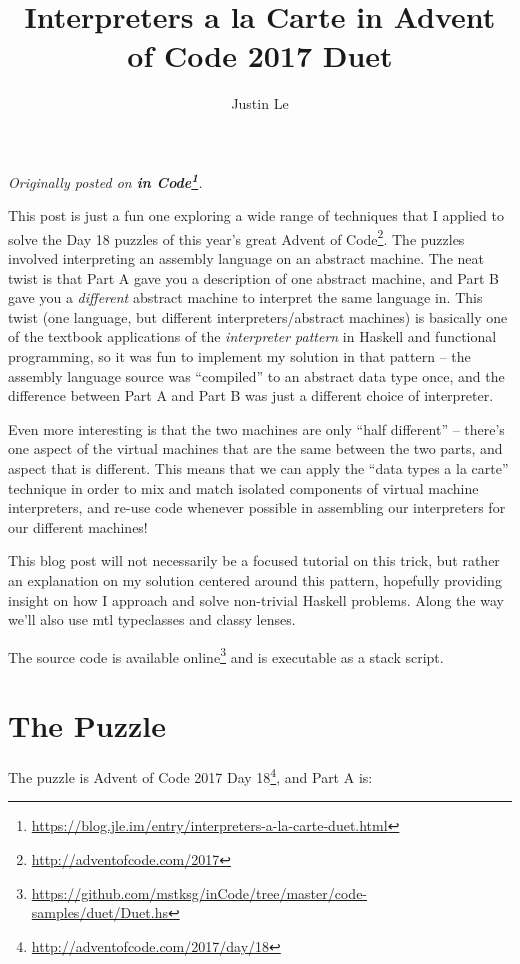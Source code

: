 \documentclass[]{article}
\title{Interpreters a la Carte in Advent of Code 2017 Duet}
\author{Justin Le}
\renewcommand{\href}[2]{#2\footnote{\url{#1}}}
\begin{document}
\maketitle

\emph{Originally posted on
\textbf{\href{https://blog.jle.im/entry/interpreters-a-la-carte-duet.html}{in
Code}}.}

This post is just a fun one exploring a wide range of techniques that I applied
to solve the Day 18 puzzles of this year's great
\href{http://adventofcode.com/2017}{Advent of Code}. The puzzles involved
interpreting an assembly language on an abstract machine. The neat twist is that
Part A gave you a description of one abstract machine, and Part B gave you a
\emph{different} abstract machine to interpret the same language in. This twist
(one language, but different interpreters/abstract machines) is basically one of
the textbook applications of the \emph{interpreter pattern} in Haskell and
functional programming, so it was fun to implement my solution in that pattern
-- the assembly language source was ``compiled'' to an abstract data type once,
and the difference between Part A and Part B was just a different choice of
interpreter.

Even more interesting is that the two machines are only ``half different'' --
there's one aspect of the virtual machines that are the same between the two
parts, and aspect that is different. This means that we can apply the ``data
types a la carte'' technique in order to mix and match isolated components of
virtual machine interpreters, and re-use code whenever possible in assembling
our interpreters for our different machines!

This blog post will not necessarily be a focused tutorial on this trick, but
rather an explanation on my solution centered around this pattern, hopefully
providing insight on how I approach and solve non-trivial Haskell problems.
Along the way we'll also use mtl typeclasses and classy lenses.

The source code is
\href{https://github.com/mstksg/inCode/tree/master/code-samples/duet/Duet.hs}{available
online} and is executable as a stack script.

\hypertarget{the-puzzle}{%
\section{The Puzzle}\label{the-puzzle}}

The puzzle is \href{http://adventofcode.com/2017/day/18}{Advent of Code 2017 Day
18}, and Part A is:
\end{document}
